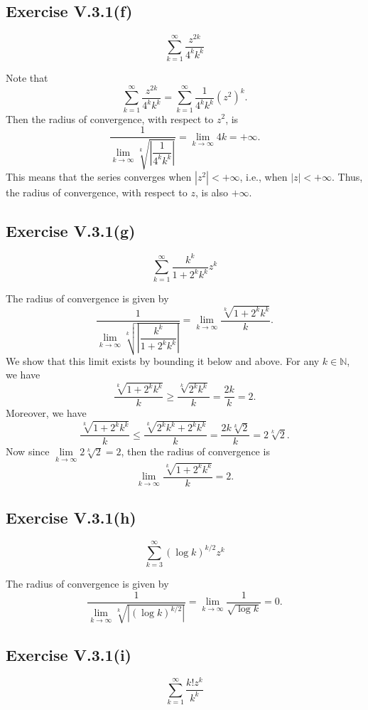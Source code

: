 \documentclass[12pt]{article}
\newenvironment{problem}
    {\begin{lrbox}{\mybox}\begin{minipage}{0.98\textwidth}}
    {\end{minipage}\end{lrbox}\framebox[\textwidth]{\usebox{\mybox}}}
\newcommand{\N}{\mathbb{N}}
\newcommand{\klim}{\lim\limits_{k \to \infty}}
\begin{document}
\subsection{Exercise V.3.1(f)}
\begin{problem}
    \[
        \sum_{k=1}^\infty \frac{z^{2k}}{4^k k^k}
    \]
\end{problem}
\medskip

Note that
\[
    \sum_{k=1}^\infty \frac{z^{2k}}{4^k k^k} = \sum_{k=1}^\infty \frac{1}{4^k k^k} \left( z^2 \right)^k.
\]
Then the radius of convergence, with respect to $z^2$, is
\[
    \frac{1}{\klim \sqrt[k]{\left| \dfrac{1}{4^k k^k} \right|}}
        = \klim 4k
        = +\infty.
\]
This means that the series converges when $\left| z^2 \right| < +\infty$, i.e., when $|z| < +\infty$. Thus, the radius of convergence, with respect to $z$, is also $+\infty$.

\subsection{Exercise V.3.1(g)}
\begin{problem}
    \[
        \sum_{k=1}^\infty \frac{k^k}{1 + 2^k k^k} z^k
    \]
\end{problem}
\medskip

The radius of convergence is given by
\[
    \frac{1}{\klim \sqrt[k]{\left| \dfrac{k^k}{1 + 2^k k^k}\right|}} = \klim \frac{\sqrt[k]{1 + 2^k k^k}}{k}.
\]
We show that this limit exists by bounding it below and above. For any $k \in \N$, we have
\[
    \frac{\sqrt[k]{1 + 2^k k^k}}{k} \geq \frac{\sqrt[k]{2^k k^k}}{k} = \frac{2k}{k} = 2.
\]
Moreover, we have
\[
    \frac{\sqrt[k]{1 + 2^k k^k}}{k} \leq \frac{\sqrt[k]{2^k k^k + 2^k k^k}}{k} = \frac{2k \sqrt[k]{2}}{k} = 2 \sqrt[k]{2}.
\]
Now since $\klim 2 \sqrt[k]{2} = 2$, then the radius of convergence is
\[
    \klim \frac{\sqrt[k]{1 + 2^k k^k}}{k} = 2.
\]

\subsection{Exercise V.3.1(h)}
\begin{problem}
    \[
        \sum_{k=3}^\infty (\log k)^{k/2} z^k
    \]
\end{problem}
\medskip

The radius of convergence is given by
\[
    \frac{1}{\klim \sqrt[k]{\left|(\log k)^{k/2}\right|}} = \klim \frac{1}{\sqrt{\log k}} = 0.
\]

\subsection{Exercise V.3.1(i)}
\begin{problem}
    \[
        \sum_{k=1}^\infty \frac{k! z^k}{k^k}
    \]
\end{problem}
\medskip
\end{document}
